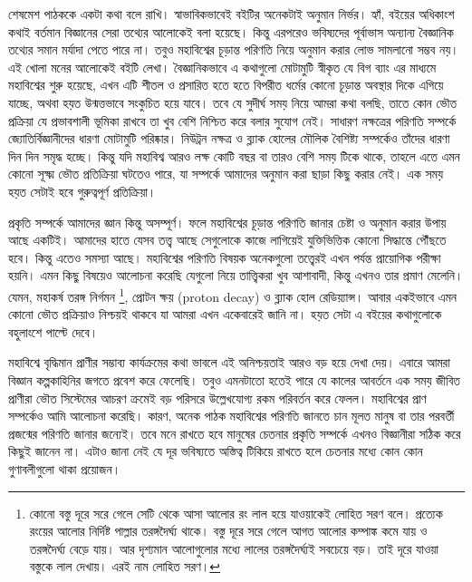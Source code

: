 \documentclass[
]{book}
\begin{document}
শেষমেশ পাঠককে একটা কথা বলে রাখি। স্বাভাবিকভাবেই বইটির অনেকটাই অনুমান নির্ভর। হ্যাঁ, বইয়ের অধিকাংশ কথাই বর্তমান বিজ্ঞানের সেরা তথ্যের আলোকেই বলা হয়েছে। কিন্তু এরপরেও ভবিষ্যদের পূর্বাভাস অন্যান্য বৈজ্ঞানিক তথ্যের সমান মর্যাদা পেতে পারে না। তবুও মহাবিশ্বের চূড়ান্ত পরিণতি নিয়ে অনুমান করার লোভ সামলানো সম্ভব নয়। এই খোলা মনের আলোকেই বইটি লেখা। বৈজ্ঞানিকভাবে এ কথাগুলো মোটামুটি স্বীকৃত যে বিগ ব্যাং এর মাধ্যমে মহাবিশ্বের শুরু হয়েছে, এখন এটি শীতল ও প্রসারিত হতে হতে বিপরীত ধর্মের কোনো চূড়ান্ত অবস্থার দিকে এগিয়ে যাচ্ছে, অথবা হয়ত উন্মত্তভাবে সংকুচিত হয়ে যাবে। তবে যে সুদীর্ঘ সময় নিয়ে আমরা কথা বলছি, তাতে কোন ভৌত প্রক্রিয়া যে প্রভাবশালী ভূমিকা রাখবে তা খুব বেশি নিশ্চিত করে বলার সুযোগ নেই। সাধারণ নক্ষত্রের পরিণতি সম্পর্কে জ্যোতির্বিজ্ঞানীদের ধারণা মোটামুটি পরিষ্কার। নিউট্রন নক্ষত্র ও ব্ল্যাক হোলের মৌলিক বৈশিষ্ট্য সম্পর্কেও তাঁদের ধারণা দিন দিন সমৃদ্ধ হচ্ছে। কিন্তু যদি মহাবিশ্ব আরও লক্ষ কোটি বছর বা তারও বেশি সময় টিকে থাকে, তাহলে এতে এমন কোনো সূক্ষ্ম ভৌত প্রতিক্রিয়া ঘটতেও পারে, যা সম্পর্কে আমাদের অনুমান করা ছাড়া কিছু করার নেই। এক সময় হয়ত সেটাই হবে গুরুত্বপূর্ণ প্রতিক্রিয়া।

প্রকৃতি সম্পর্কে আমাদের জ্ঞান কিন্তু অসম্পূর্ণ। ফলে মহাবিশ্বের চূড়ান্ত পরিণতি জানার চেষ্টা ও অনুমান করার উপায় আছে একটিই। আমাদের হাতে যেসব তত্ত্ব আছে সেগুলোকে কাজে লাগিয়েই যুক্তিভিত্তিক কোনো সিদ্ধান্তে পৌঁছতে হবে। কিন্তু এতেও সমস্যা আছে। মহাবিশ্বের পরিণতি বিষয়ক অনেকগুলো তত্ত্বেরই এখন পর্যন্ত প্রায়োগিক পরীক্ষা হয়নি। এমন কিছু বিষয়েও আলোচনা করেছি যেগুলো নিয়ে তাত্ত্বিকরা খুব আশাবাদী, কিন্তু এখনও তার প্রমাণ মেলেনি। যেমন, মহাকর্ষ তরঙ্গ নির্গমন \footnote{কোনো বস্তু দূরে সরে গেলে সেটি থেকে আসা আলোর রং লাল হয়ে যাওয়াকেই লোহিত সরণ বলে। প্রত্যেক রংয়ের আলোর নির্দিষ্ট পাল্লার তরঙ্গদৈর্ঘ্য থাকে। বস্তু দূরে সরে গেলে আগত আলোর কম্পাঙ্ক কমে যায় ও তরঙ্গদৈর্ঘ্য বেড়ে যায়। আর দৃশ্যমান আলোগুলোর মধ্যে লালের তরঙ্গদৈর্ঘ্যই সবচেয়ে বড়। তাই দূরে যাওয়া বস্তুকে লাল দেখায়। এরই নাম লোহিত সরণ।}, প্রোটন ক্ষয় (proton decay) ও ব্ল্যাক হোল রেডিয়্যান্স। আবার একইভাবে এমন কোনো ভৌত প্রক্রিয়াও নিশ্চয়ই থাকবে যা আমরা এখন একেবারেই জানি না। হয়ত সেটা এ বইয়ের কথাগুলোকে বহুলাংশে পাল্টে দেবে।

মহাবিশ্বে বৃদ্ধিমান প্রাণীর সম্ভাব্য কার্যক্রমের কথা ভাবলে এই অনিশ্চয়তাই আরও বড় হয়ে দেখা দেয়। এবারে আমরা বিজ্ঞান কল্পকাহিনির জগতে প্রবেশ করে ফেলেছি। তবুও এমনটাতো হতেই পারে যে কালের আবর্তনে এক সময় জীবিত প্রাণীরা ভৌত সিস্টেমের আচরণ ক্রমেই বড় পরিসরে উল্লেখযোগ্য রকম পরিবর্তন করে ফেলল। মহাবিশ্বের প্রাণ সম্পর্কেও আমি আলোচনা করেছি। কারণ, অনেক পাঠক মহাবিশ্বের পরিণতি জানতে চান মূলত মানুষ বা তার পরবর্তী প্রজন্মের পরিণতি জানার জন্যেই। তবে মনে রাখতে হবে মানুষের চেতনার প্রকৃতি সম্পর্কে এখনও বিজ্ঞানীরা সঠিক করে কিছুই জানেন না। এটাও জানা নেই যে দূর ভবিষ্যতে অস্তিত্ব টিকিয়ে রাখতে হলে চেতনার মধ্যে কোন কোন গুণাবলীগুলো থাকা প্রয়োজন।
\end{document}
